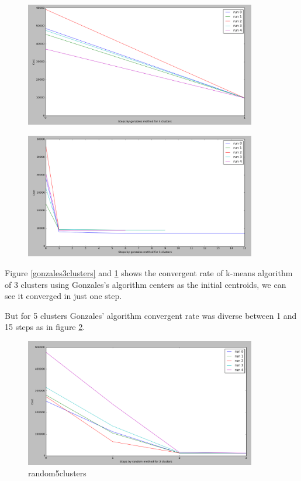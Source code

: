 \begin{figure}[!htb]
\centering
\includegraphics[width=0.9\textwidth]{shots/gonzales4clusters.png}
\caption{ }
\label{gonzales4clusters}
\end{figure}

\begin{figure}[!htb]
\centering
\includegraphics[width=0.9\textwidth]{shots/gonzales5clusters.png}
\caption{ }
\label{gonzales5clusters}
\end{figure}

Figure \ref{gonzales3clusters} and \ref{gonzales4clusters} shows the convergent rate of k-means algorithm of 3 clusters using Gonzales's algorithm centers as the initial centroids, we can see it converged in just one step.

But for 5 clusters Gonzales' algorithm convergent rate was diverse between 1 and 15 steps as in figure \ref{gonzales5clusters}.

\begin{figure}[!htb]
\centering
\includegraphics[width=0.9\textwidth]{shots/random3clusters.png}
\caption{ random5clusters}
\label{random3clusters}
\end{figure}



